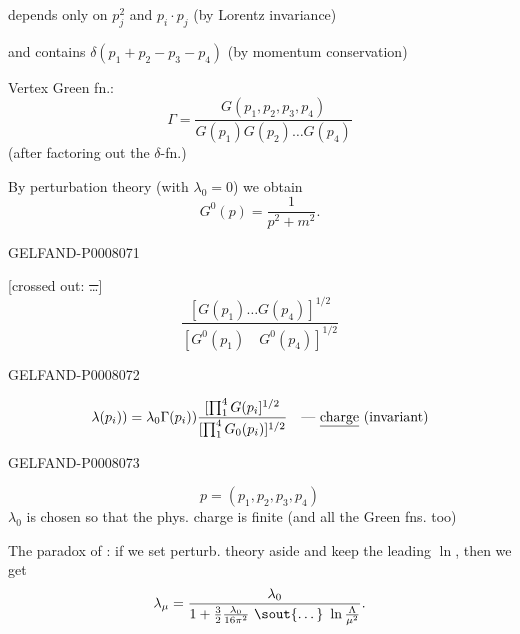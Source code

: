  depends only on \(p_j^2\) and \(p_i\cdot p_j\)
(by Lorentz invariance)

and contains \(\delta(p_1+p_2-p_3-p_4)\) (by momentum conservation)

Vertex Green fn.:
\begin{equation*}
\Gamma=\frac{G(p_1,p_2,p_3,p_4)}{G(p_1)G(p_2)\ldots G(p_4)}
\tag{4}
\end{equation*}
(after factoring out the \(\delta\)-fn.)

By perturbation theory (with \(\lambda_0=0\)) we obtain
\begin{equation*}
G^0(p)=\frac{1}{p^2+m^2}.
\tag{5}
\end{equation*}


\begin{GelfandAdjacentEvidence}{GELFAND-P000807}{1}

[crossed out: \sout{\ldots}]
\[
\frac{[G(p_1)\ldots G(p_4)]^{1/2}}{[G^0(p_1)\quad G^0(p_4)]^{1/2}}
\]
\end{GelfandAdjacentEvidence}
\begin{GelfandAdjacentEvidence}{GELFAND-P000807}{2}


\[
\lambda(p_i))=\lambda_0\Gamma(p_i))
\frac{[\prod_1^4G(p_i]^{1/2}}{[\prod_1^4G_0(p_i)]^{1/2}}
\quad\text{--- \underline{charge} (invariant)}
\]
\end{GelfandAdjacentEvidence}
\begin{GelfandAdjacentEvidence}{GELFAND-P000807}{3}

\[
p=(p_1,p_2,p_3,p_4)
\]
\(\lambda_0\) is chosen so that the phys. charge is finite (and all the Green fns. too)

The paradox of :
if we set perturb. theory aside and keep the leading \(\ln\), then we get
\[
\lambda_\mu=\frac{\lambda_0}{1+\frac{3}{2}\frac{\lambda_0}{16\pi^2}
\ \text{\sout{\ldots}}\ \ln\frac{\Lambda}{\mu^2}}.
\]
\end{GelfandAdjacentEvidence}
